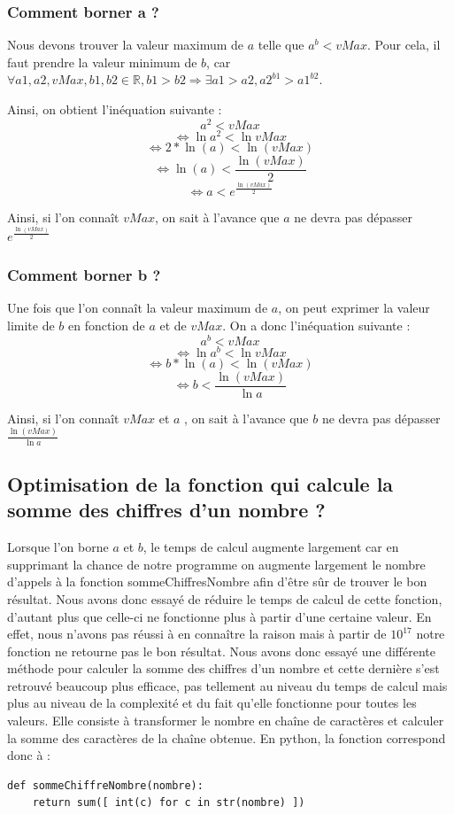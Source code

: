 \documentclass{article}
\begin{document}
\subsubsection{Comment borner a ?}

	Nous devons trouver la valeur maximum de $a$ telle que $a^{b} < vMax$. Pour cela, il faut prendre la valeur minimum de $b$, car $\forall a1, a2, vMax, b1, b2 \in \mathbb{R}, b1 > b2 \Rightarrow \exists a1 > a2, a2^{b1} > a1^{b2}$.

Ainsi, on obtient l'inéquation suivante : \[ a^{2} < vMax \]
 \[ \Leftrightarrow \ln{a^{2}} < \ln{vMax} \]
\[ \Leftrightarrow 2*\ln(a) < \ln(vMax)  \]
\[ \Leftrightarrow \ln(a) < \frac{\ln(vMax)}{2}  \]
\[  \Leftrightarrow a < e^{\frac{\ln(vMax)}{2}} \]

Ainsi, si l'on connaît $vMax$, on sait à l'avance que $a$ ne devra pas dépasser $e^{\frac{\ln(vMax)}{2}}$


\subsubsection{Comment borner b ?}

Une fois que l'on connaît la valeur maximum de $a$, on peut exprimer la valeur limite de $b$ en fonction de $a$ et de $vMax$. On a donc l'inéquation suivante :  \[ a^{b} < vMax \]
 \[ \Leftrightarrow \ln{a^{b}} < \ln{vMax} \]
\[ \Leftrightarrow b*\ln(a) < \ln(vMax)  \]
\[ \Leftrightarrow b < \frac{\ln(vMax)}{\ln{a}}  \]

Ainsi, si l'on connaît $vMax$ et $a$ , on sait à l'avance que $b$ ne devra pas dépasser $\frac{\ln(vMax)}{\ln{a}}$

\subsection{Optimisation de la fonction qui calcule la somme des chiffres d'un nombre ?}

Lorsque l'on borne $a$ et $b$, le temps de calcul augmente largement car en supprimant la chance de notre programme on augmente largement le nombre d'appels à la fonction sommeChiffresNombre afin d'être sûr de trouver le bon résultat. Nous avons donc essayé de réduire le temps de calcul de cette fonction, d'autant plus que celle-ci ne fonctionne plus à partir d'une certaine valeur. En effet, nous n'avons pas réussi à en connaître la raison mais à partir de $10^{17}$ notre fonction ne retourne pas le bon résultat. Nous avons donc essayé une différente méthode pour calculer la somme des chiffres d'un nombre et cette dernière s'est retrouvé beaucoup plus efficace, pas tellement au niveau du temps de calcul mais plus au niveau de la complexité et du fait qu'elle fonctionne pour toutes les valeurs. Elle consiste à transformer le nombre en chaîne de caractères et calculer la somme des caractères de la chaîne obtenue. En python, la fonction correspond donc à :
\begin{lstlisting}
def sommeChiffreNombre(nombre):
    return sum([ int(c) for c in str(nombre) ])
\end{lstlisting}
\end{document}

